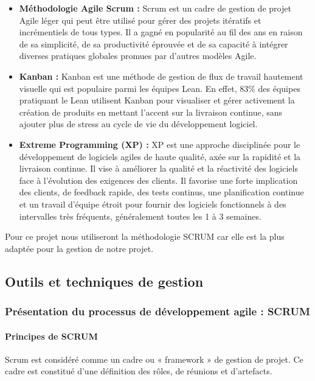 \begin{itemize}
    \item \textbf{Méthodologie Agile Scrum : } Scrum  est un cadre de gestion de projet Agile léger qui peut être utilisé pour gérer des projets itératifs et incrémentiels de tous types. Il a gagné en popularité au fil des ans en raison de sa simplicité, de sa productivité éprouvée et de sa capacité à intégrer diverses pratiques globales promues par d'autres modèles Agile.
    \item \textbf{Kanban : } Kanban  est une méthode de gestion de flux de travail hautement visuelle qui est populaire parmi les équipes Lean. En effet, 83\% des équipes pratiquant le Lean utilisent Kanban pour visualiser et gérer activement la création de produits en mettant l'accent sur la livraison continue, sans ajouter plus de stress au cycle de vie du développement logiciel.
    \item \textbf{Extreme Programming (XP) : } XP est une approche disciplinée pour le développement de logiciels agiles de haute qualité, axée sur la rapidité et la livraison continue. Il vise à améliorer la qualité et la réactivité des logiciels face à l'évolution des exigences des clients. Il favorise une forte implication des clients, de feedback rapide, des tests continus, une planification continue et un travail d'équipe étroit pour fournir des logiciels fonctionnels à des intervalles très fréquents, généralement toutes les 1 à 3 semaines.
\end{itemize}

Pour ce projet nous utiliseront la méthodologie SCRUM car elle est la plus adaptée pour la gestion de notre projet.



\subsection{Outils et techniques de gestion}
\subsubsection{Présentation du processus de développement agile : SCRUM}
\paragraph{Principes de SCRUM}
Scrum est considéré comme un cadre ou « framework » de gestion de projet. Ce cadre est constitué d'une définition des rôles, de réunions et d'artefacts.

